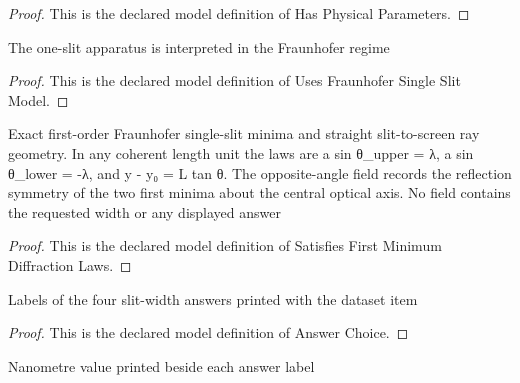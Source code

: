 \begin{proof}
  This is the declared model definition of Has Physical Parameters.
\end{proof}
\begin{definition}
  \label{def:physics:phyx-mini-0047:phyxminiproblems-problemphyxmini0047-usesfraunhofersingleslitmodel}
  The one-slit apparatus is interpreted in the Fraunhofer regime
\end{definition}
\begin{proof}
  This is the declared model definition of Uses Fraunhofer Single Slit Model.
\end{proof}
\begin{definition}
  \label{def:physics:phyx-mini-0047:phyxminiproblems-problemphyxmini0047-satisfiesfirstminimumdiffractionlaws}
  Exact first-order Fraunhofer single-slit minima and straight slit-to-screen ray geometry. In any coherent length unit the laws are a sin θ\_upper = λ, a sin θ\_lower = -λ, and y - y₀ = L tan θ. The opposite-angle field records the reflection symmetry of the two first minima about the central optical axis. No field contains the requested width or any displayed answer
\end{definition}
\begin{proof}
  This is the declared model definition of Satisfies First Minimum Diffraction Laws.
\end{proof}
\begin{definition}
  \label{def:physics:phyx-mini-0047:phyxminiproblems-problemphyxmini0047-answerchoice}
  Labels of the four slit-width answers printed with the dataset item
\end{definition}
\begin{proof}
  This is the declared model definition of Answer Choice.
\end{proof}
\begin{definition}
  \label{def:physics:phyx-mini-0047:phyxminiproblems-problemphyxmini0047-displayedslitwidthinnanometers}
  Nanometre value printed beside each answer label
\end{definition}
